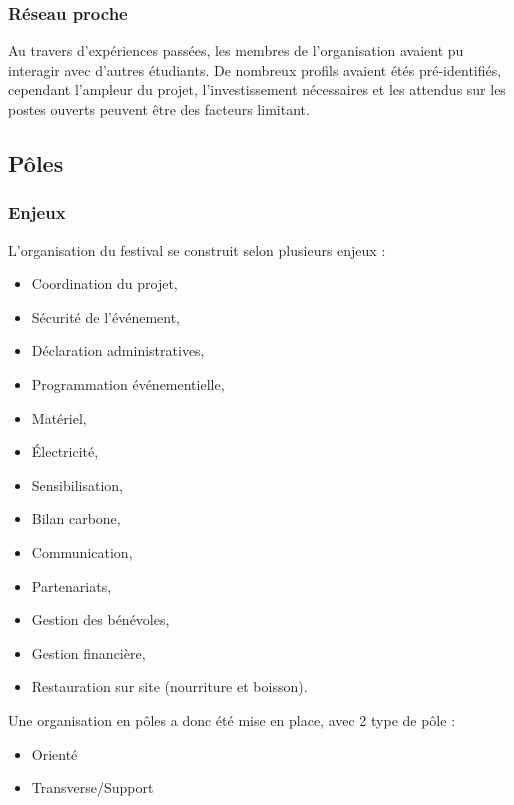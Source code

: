 \documentclass[12pt,a4paper,draft]{report}
\begin{document}
\subsubsection{Réseau proche}
Au travers d'expériences passées, les membres de l'organisation avaient pu interagir avec d'autres étudiants. De nombreux profils avaient étés pré-identifiés, cependant l'ampleur du projet, l'investissement nécessaires et les attendus sur les postes ouverts peuvent être des facteurs limitant.

\subsection{Pôles}
\subsubsection{Enjeux}
L'organisation du festival se construit selon plusieurs enjeux : 
\begin{itemize}
\item Coordination du projet,
\item Sécurité de l'événement,
\item Déclaration administratives,
\item Programmation événementielle,
\item Matériel,
\item Électricité,
\item Sensibilisation,
\item Bilan carbone,
\item Communication,
\item Partenariats,
\item Gestion des bénévoles,
\item Gestion financière,
\item Restauration sur site (nourriture et boisson). \\
\end{itemize}

Une organisation en pôles a donc été mise en place, avec 2 type de pôle : 
\begin{itemize}
\item Orienté
\item Transverse/Support
\end{itemize}
\end{document}
